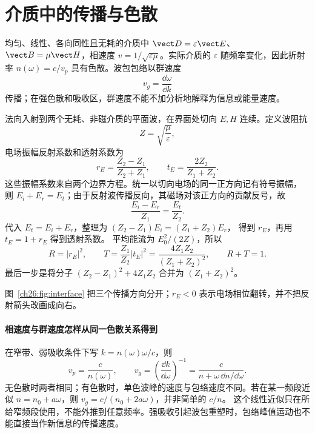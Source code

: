 \section{介质中的传播与色散}

均匀、线性、各向同性且无耗的介质中 $\vect D=\varepsilon\vect E$、$\vect B=\mu\vect H$，相速度
$v=1/\sqrt{\varepsilon\mu}$。实际介质的 $\varepsilon$ 随频率变化，因此折射率
$n(\omega)=c/v_p$ 具有色散。波包包络以群速度
\begin{equation}
 v_g=\frac{\dd\omega}{\dd k}
\end{equation}
传播；在强色散和吸收区，群速度不能不加分析地解释为信息或能量速度。

法向入射到两个无耗、非磁介质的平面波，在界面处切向 $E,H$ 连续。定义波阻抗
\begin{equation}
 Z=\sqrt{\frac{\mu}{\varepsilon}},
\end{equation}
电场振幅反射系数和透射系数为
\begin{equation}
 r_E=\frac{Z_2-Z_1}{Z_2+Z_1},
 \qquad
 t_E=\frac{2Z_2}{Z_1+Z_2}.
\end{equation}
这些振幅系数来自两个边界方程。统一以切向电场的同一正方向记有符号振幅，
则 $E_i+E_r=E_t$；由于反射波传播反向，其磁场对该正方向的贡献反号，故
\[
 \frac{E_i-E_r}{Z_1}=\frac{E_t}{Z_2}.
\]
代入 $E_t=E_i+E_r$，整理为 $(Z_2-Z_1)E_i=(Z_1+Z_2)E_r$，
得到 $r_E$，再用 $t_E=1+r_E$ 得到透射系数。
平均能流为 $E_0^2/(2Z)$，所以
\[
 R=|r_E|^2,\qquad T=\frac{Z_1}{Z_2}|t_E|^2
   =\frac{4Z_1Z_2}{(Z_1+Z_2)^2},\qquad R+T=1.
\]
最后一步是将分子 $(Z_2-Z_1)^2+4Z_1Z_2$ 合并为 $(Z_1+Z_2)^2$。

\begin{center}
\label{ch26:fig:interface}
\end{center}
图~\ref{ch26:fig:interface} 把三个传播方向分开；$r_E<0$ 表示电场相位翻转，并不把反射箭头改画成向右。


\paragraph{相速度与群速度怎样从同一色散关系得到}
在窄带、弱吸收条件下写 $k=n(\omega)\omega/c$，则
\[
 v_p=\frac c{n(\omega)},\qquad
 v_g=\left(\frac{\dd k}{\dd\omega}\right)^{-1}
 =\frac c{n+\omega\,\dd n/\dd\omega}.
\]
无色散时两者相同；有色散时，单色波峰的速度与包络速度不同。若在某一频段近似 $n=n_0+a\omega$，则 $v_g=c/(n_0+2a\omega)$，并非简单的 $c/n$。
这个线性近似只在所给窄频段使用，不能外推到任意频率。强吸收引起波包重塑时，包络峰值运动也不能直接当作新信息的传播速度。

